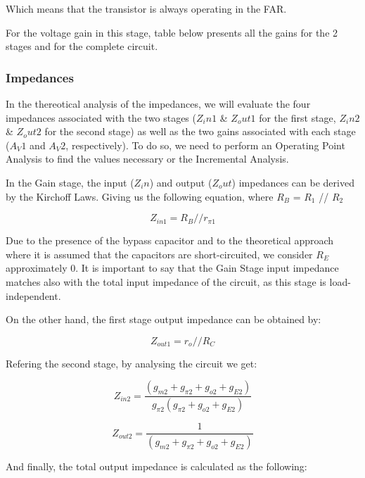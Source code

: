 Which means that the transistor is always operating in the FAR.

For the voltage gain in this stage, table below presents all the gains for the 2 stages and for the complete circuit.

\subsubsection{Impedances}

In the thereotical analysis of the impedances, we will evaluate the four impedances associated with the two
stages ($Z_in1$ \& $Z_out1$ for the first stage, $Z_in2$ \& $Z_out2$ for the second stage) as well as the two gains associated with each stage ($A_V1$ and $A_V2$, respectively). To do so, we need to perform an Operating Point Analysis to find the values necessary or the Incremental Analysis. \par
In the Gain stage, the input ($Z_in$) and output ($Z_out$) impedances can be derived by the Kirchoff Laws.
Giving us the following equation, where $R_B$ = $R_1$ // $R_2$

\begin{equation}
    Z_{in1}=R_B // r_{\pi 1}
\end{equation}

Due to the presence of the bypass capacitor and to the theoretical approach where it is assumed that the capacitors are short-circuited, we consider $R_E$ approximately 0. It is important to say that the Gain Stage input impedance matches also with the total input impedance of the circuit, as this stage is load-independent. \par
On the other hand, the first stage output impedance can be obtained by:

\begin{equation}
Z_{out1} = {r_o}//{R_{C}}
\label{eq3}
\end{equation} 

Refering the second stage, by analysing the circuit we get:

\begin{equation}
    Z_{in2}=\frac{(g_{m2}+g_{\pi2}+g_{o2}+g_{E2})}{g_{\pi2}(g_{\pi2}+g_{o2}+g_{E2})}
\end{equation}

\begin{equation}
    Z_{out2}=\frac{1}{(g_{m2}+g_{\pi2}+g_{o2}+g_{E2})}
\end{equation}

And finally, the total output impedance is calculated as the following:

